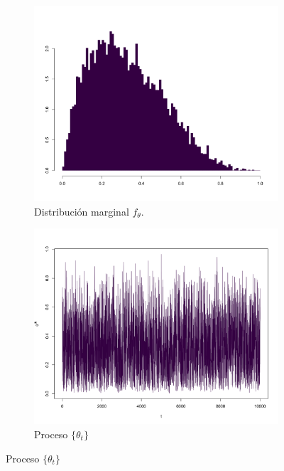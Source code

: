 \documentclass[11pt,a4paper]{article}
\begin{document}
\begin{figure}[!p]
    \vspace{0.2cm}
    
    \begin{subfigure}[t]{0.45\textwidth}
        \centering
        \includegraphics[width=\linewidth]{hier_hist_theta.png} 
        \caption{Distribución marginal $f_\theta$.} \label{fig:hier_hist_theta}
    \end{subfigure}
    \hfill
    \begin{subfigure}[t]{0.45\textwidth}
        \centering
        \includegraphics[width=\linewidth]{hier_chain_theta.png} 
        \caption{Proceso $\lbrace \theta_t \rbrace$} \label{fig:hier_chain_theta}
    \end{subfigure}
    

\end{figure}
\end{document}
